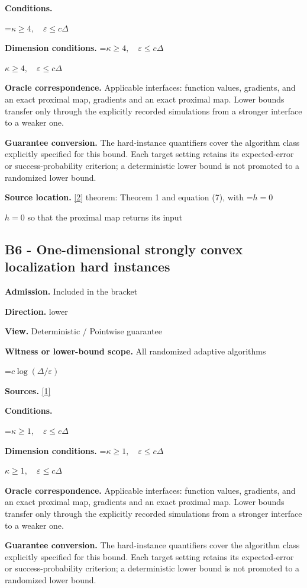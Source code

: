\documentclass[10pt,a4paper]{article}
\newcommand{\AtlasMath}[1]{\par\begingroup\centering\setbox0=\hbox{$\displaystyle #1$}\ifdim\wd0>1.4\linewidth\typeout{ATLAS WIDE FORMULA: \the\wd0}\fi\ifdim\wd0>\linewidth\resizebox{\linewidth}{!}{\box0}\else\box0\fi\par\endgroup}
\newcommand{\AtlasInlineMath}[1]{\begingroup\setbox0=\hbox{$#1$}\ifdim\wd0>.4\linewidth\endgroup\AtlasMath{#1}\else\endgroup$#1$\fi}
\begin{document}
\textbf{Conditions.} 
\AtlasMath{\kappa\ge4,\quad\varepsilon\le c\Delta}


\textbf{Dimension conditions.} \AtlasInlineMath{\kappa\ge4,\quad\varepsilon\le c\Delta}

\textbf{Oracle correspondence.} Applicable interfaces: function values, gradients, and an exact proximal map, gradients and an exact proximal map. Lower bounds transfer only through the explicitly recorded simulations from a stronger interface to a weaker one.

\textbf{Guarantee conversion.} The hard-instance quantifiers cover the algorithm class explicitly specified for this bound. Each target setting retains its expected-error or success-probability criterion; a deterministic lower bound is not promoted to a randomized lower bound.

\textbf{Source location.} \href{https://arxiv.org/pdf/2609.10874}{[2]} theorem: Theorem 1 and equation (7), with \AtlasInlineMath{h=0} so that the proximal map returns its input

\subsection{B6 - One-dimensional strongly convex localization hard instances}
\textbf{Admission.} Included in the bracket

\textbf{Direction.} lower

\textbf{View.} Deterministic / Pointwise guarantee

\textbf{Witness or lower-bound scope.} All randomized adaptive algorithms

\AtlasMath{c\log(\Delta/\varepsilon)}
\textbf{Sources.} \href{https://www.tau.ac.il/~becka/FISTA.pdf}{[1]}

\textbf{Conditions.} 
\AtlasMath{\kappa\ge1,\quad\varepsilon\le c\Delta}


\textbf{Dimension conditions.} \AtlasInlineMath{\kappa\ge1,\quad\varepsilon\le c\Delta}

\textbf{Oracle correspondence.} Applicable interfaces: function values, gradients, and an exact proximal map, gradients and an exact proximal map. Lower bounds transfer only through the explicitly recorded simulations from a stronger interface to a weaker one.

\textbf{Guarantee conversion.} The hard-instance quantifiers cover the algorithm class explicitly specified for this bound. Each target setting retains its expected-error or success-probability criterion; a deterministic lower bound is not promoted to a randomized lower bound.
\end{document}
